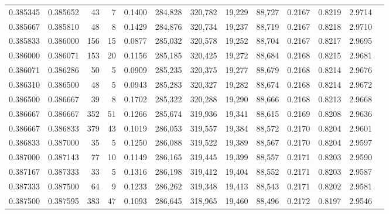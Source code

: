\begin{tabular}{rrrrrrrrrrrrr}
0.385345 & 0.385652 &    43 &   7 &                                     0.1400 & 284,828 & 320,782 &  19,229 &  88,727 & 0.2167 & 0.8219 & 2.9714 \\
0.385667 & 0.385810 &    48 &   8 &                                     0.1429 & 284,876 & 320,734 &  19,237 &  88,719 & 0.2167 & 0.8218 & 2.9710 \\
0.385833 & 0.386000 &   156 &  15 &                                     0.0877 & 285,032 & 320,578 &  19,252 &  88,704 & 0.2167 & 0.8217 & 2.9695 \\
0.386000 & 0.386071 &   153 &  20 &                                     0.1156 & 285,185 & 320,425 &  19,272 &  88,684 & 0.2168 & 0.8215 & 2.9681 \\
0.386071 & 0.386286 &    50 &   5 &                                     0.0909 & 285,235 & 320,375 &  19,277 &  88,679 & 0.2168 & 0.8214 & 2.9676 \\
0.386310 & 0.386500 &    48 &   5 &                                     0.0943 & 285,283 & 320,327 &  19,282 &  88,674 & 0.2168 & 0.8214 & 2.9672 \\
0.386500 & 0.386667 &    39 &   8 &                                     0.1702 & 285,322 & 320,288 &  19,290 &  88,666 & 0.2168 & 0.8213 & 2.9668 \\
0.386667 & 0.386667 &   352 &  51 &                                     0.1266 & 285,674 & 319,936 &  19,341 &  88,615 & 0.2169 & 0.8208 & 2.9636 \\
0.386667 & 0.386833 &   379 &  43 &                                     0.1019 & 286,053 & 319,557 &  19,384 &  88,572 & 0.2170 & 0.8204 & 2.9601 \\
0.386833 & 0.387000 &    35 &   5 &                                     0.1250 & 286,088 & 319,522 &  19,389 &  88,567 & 0.2170 & 0.8204 & 2.9597 \\
0.387000 & 0.387143 &    77 &  10 &                                     0.1149 & 286,165 & 319,445 &  19,399 &  88,557 & 0.2171 & 0.8203 & 2.9590 \\
0.387167 & 0.387333 &    33 &   5 &                                     0.1316 & 286,198 & 319,412 &  19,404 &  88,552 & 0.2171 & 0.8203 & 2.9587 \\
0.387333 & 0.387500 &    64 &   9 &                                     0.1233 & 286,262 & 319,348 &  19,413 &  88,543 & 0.2171 & 0.8202 & 2.9581 \\
0.387500 & 0.387595 &   383 &  47 &                                     0.1093 & 286,645 & 318,965 &  19,460 &  88,496 & 0.2172 & 0.8197 & 2.9546 \\

\end{tabular}
